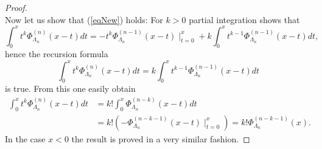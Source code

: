 \documentclass[10pt,a4paper]{amsart}
\begin{document}
\begin{proof}
\begin{equation}
\end{equation}
Now let us show that (\ref{eqNew}) holds: For $k>0$ partial integration shows
that
\[
\int_{0}^{x}t^{k}\Phi_{\Lambda_{n}}^{\left(  n\right)  }\left(  x-t\right)
dt=-t^{k}\Phi_{\Lambda_{n}}^{\left(  n-1\right)  }\left(  x-t\right)
\mid_{t=0}^{x}+k\int_{0}^{x}t^{k-1}\Phi_{\Lambda_{n}}^{\left(  n-1\right)
}\left(  x-t\right)  dt,
\]
hence the recursion formula
\[
\int_{0}^{x}t^{k}\Phi_{\Lambda_{n}}^{\left(  n\right)  }\left(  x-t\right)
dt=k\int_{0}^{x}t^{k-1}\Phi_{\Lambda_{n}}^{\left(  n-1\right)  }\left(
x-t\right)  dt
\]
is true. From this one easily obtain
\begin{align*}
\int_{0}^{x}t^{k}\Phi_{\Lambda_{n}}^{\left(  n\right)  }\left(  x-t\right)
dt  &  =k!\int_{0}^{x}\Phi_{\Lambda_{n}}^{\left(  n-k\right)  }\left(
x-t\right)  dt\\
&  =k!\left(  -\Phi_{\Lambda_{n}}^{\left(  n-k-1\right)  }\left(  x-t\right)
\mid_{t=0}^{x}\right)  =k!\Phi_{\Lambda_{n}}^{\left(  n-k-1\right)  }\left(
x\right)  .
\end{align*}
In the case $x<0$ the result is proved in a very similar fashion.
\end{proof}
\end{document}
